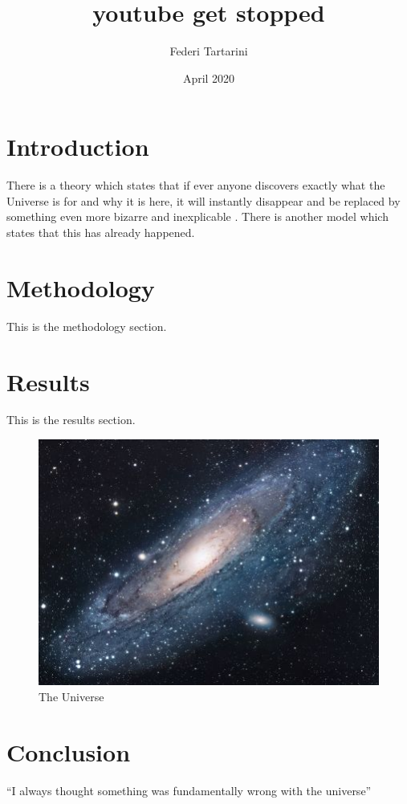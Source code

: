 \documentclass{article}
\title{youtube get stopped}
\author{Federi Tartarini}
\date{April 2020}
\begin{document}
\maketitle

\section{Introduction}
There is a theory which states that if ever anyone discovers exactly what the Universe is for and why it is here, it will instantly disappear and be replaced by something even more bizarre and inexplicable \citep{databaseII}.
There is another model which states that this has already happened.

\section{Methodology}
This is the methodology section.

\section{Results}
This is the results section.

\begin{figure}[h!]
\centering
\includegraphics[scale=1.7]{universe}
\caption{The Universe}
\label{fig:universe}
\end{figure}

\section{Conclusion}
``I always thought something was fundamentally wrong with the universe'' \citep{adams1995hitchhiker}



\end{document}
